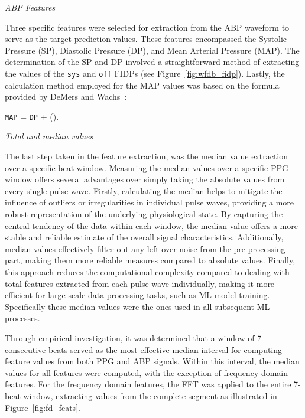 \vspace{0.2cm}
\textit{ABP Features}
\vspace{0.2cm}

Three specific features were selected for extraction from the ABP waveform to serve as the target prediction values.
These features encompassed the Systolic Pressure (SP), Diastolic Pressure (DP), and Mean Arterial Pressure (MAP).
The determination of the SP and DP involved a straightforward method of extracting the values of the \texttt{sys} and \texttt{off} FIDPs (see Figure~\ref{fig:wfdb_fidp}).
Lastly, the calculation method employed for the MAP values was based on the formula provided by DeMers and Wachs~\cite{demersPhysiologyMeanArterial2024}:

\vspace{0.1cm}
{\centering  \large \texttt{MAP} = \texttt{DP} + \left().\right \par}
\vspace{0.1cm}
\normalsize

\vspace{0.2cm}
\textit{Total and median values}
\vspace{0.2cm}

The last step taken in the feature extraction, was the median value extraction over a specific beat window.
Measuring the median values over a specific PPG window offers several advantages over simply taking the absolute values from every single pulse wave.
Firstly, calculating the median helps to mitigate the influence of outliers or irregularities in individual pulse waves, providing a more robust representation of the underlying physiological state.
By capturing the central tendency of the data within each window, the median value offers a more stable and reliable estimate of the overall signal characteristics.
Additionally, median values effectively filter out any left-over noise from the pre-processing part, making them more reliable measures compared to absolute values.
Finally, this approach reduces the computational complexity compared to dealing with total features extracted from each pulse wave individually, making it more efficient for large-scale data processing tasks, such as ML model training.
Specifically these median values were the ones used in all subsequent ML processes.

Through empirical investigation, it was determined that a window of 7 consecutive beats served as the most effective median interval
for computing feature values from both PPG and ABP signals.
Within this interval, the median values for all features were computed, with the exception of frequency domain features.
For the frequency domain features, the FFT was applied to the entire 7-beat window, extracting values from the complete segment as illustrated in Figure~\ref{fig:fd_feats}.

